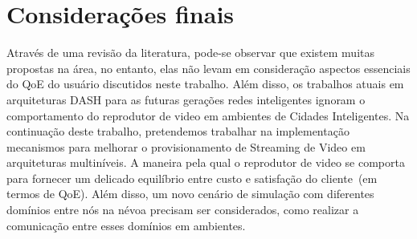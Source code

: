 \clearpage
\section{Considerações finais}
\label{ch:remarks}

Através de uma revisão da literatura, pode-se observar que existem muitas propostas na área, no entanto, elas não levam em consideração aspectos essenciais do QoE do usuário discutidos neste trabalho. Além disso, os trabalhos atuais em arquiteturas DASH para as futuras gerações redes inteligentes ignoram o comportamento do reprodutor de video em ambientes de Cidades Inteligentes. 
Na continuação deste trabalho, pretendemos trabalhar na implementação mecanismos para melhorar o provisionamento de Streaming de Video em arquiteturas multiníveis. A maneira pela qual o reprodutor de video se comporta para fornecer um delicado equilíbrio entre custo e satisfação do cliente~(em termos de QoE). 
Além disso, um novo cenário de simulação com diferentes domínios entre nós na névoa precisam ser considerados, como realizar a comunicação entre esses domínios em ambientes.










